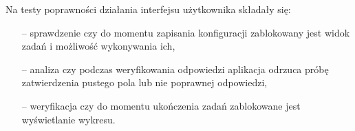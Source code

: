 Na testy poprawności działania interfejsu użytkownika składały się:
\begin{itemize}
  \item [--] sprawdzenie czy do momentu zapisania konfiguracji zablokowany jest widok zadań i
        możliwość wykonywania ich,
  \item [--] analiza czy podczas weryfikowania odpowiedzi aplikacja odrzuca próbę zatwierdzenia
        pustego pola lub nie poprawnej odpowiedzi,
  \item [--] weryfikacja czy do momentu ukończenia zadań zablokowane jest wyświetlanie wykresu.
\end{itemize}